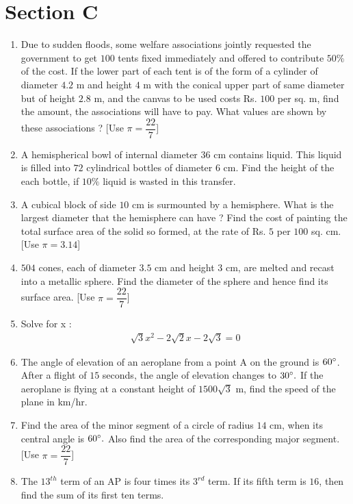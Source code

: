 \documentclass[journal,12pt,twocolumn]{IEEEtran}
\renewcommand\thesection{\arabic{section}}
\begin{document}
\section{Section C}
\renewcommand{\theequation}{\theenumi}
\begin{enumerate}[label=\thesection.\arabic*.,ref=\thesection.\theenumi]
\item Due to sudden floods, some welfare associations jointly requested the government to get $100$ tents fixed immediately and offered to contribute $ 50\% $ of the cost. If the lower part of each tent is of the form of a cylinder of diameter $4.2$ m and height $4$ m with the conical upper part of same diameter but of height $2.8$ m, and the canvas to be used costs Rs. $100$ per sq. m, find the amount, the associations will have to pay. What values are shown by these associations ? [Use $\pi=\dfrac{22}{7}$]
\item A hemispherical bowl of internal diameter $36$ cm contains liquid. This liquid is filled into $72$ cylindrical bottles of diameter $6$ cm. Find the height of the each bottle, if $10 \% $ liquid is wasted in this transfer.
\item A cubical block of side $10$ cm is surmounted by a hemisphere. What is the largest diameter that the hemisphere can have ? Find the cost of painting the total surface area of the solid so formed, at the rate of Rs. $5$ per $100$ sq. cm. [Use $\pi= 3.14$]
\item $504$ cones, each of diameter $3.5$ cm and height $3$ cm, are melted and recast into a metallic sphere. Find the diameter of the sphere and hence find its surface area. [Use $\pi=\dfrac{22}{7}$]
\item Solve for x :
 \begin{align*}
     \sqrt{3}x^2 -2\sqrt{2}x-2\sqrt{3}= 0 
 \end{align*}
\item The angle of elevation of an aeroplane from a point A on the ground is $60 \degree  $. After a flight of $15$ seconds, the angle of elevation changes to $  30 \degree.$ If the aeroplane is flying at a constant height of $1500\sqrt{3}$ m, find the speed of the plane in km/hr.
\item Find the area of the minor segment of a circle of radius $14$ cm, when its central angle is $60 \degree.$ Also find the area of the corresponding major segment. [Use $\pi =\dfrac{22}{7}$]
\item The $13^{th}$ term of an AP is four times its $3^{rd}$ term. If its fifth term is $16$, then find the sum of its first ten terms.

\end{enumerate}
\end{document}
